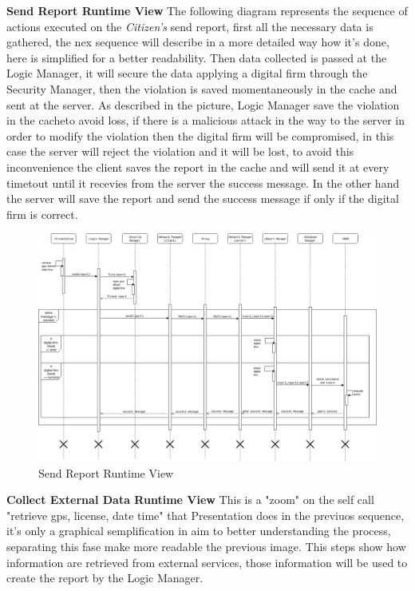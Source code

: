 \documentclass{article}
\begin{document}
\textbf{Send Report Runtime View}
The following diagram represents the sequence of actions executed on the \textit{Citizen's} send report, 
first all the necessary data is gathered, the nex sequence will describe in a more detailed way how it's 
done, here is simplified for a better readability. Then data collected is passed at the Logic Manager, 
it will secure the data applying a digital firm through the Security Manager, then the violation is 
saved momentaneously in the cache and sent at the server. As described in the picture, Logic Manager 
save the violation in the cacheto avoid loss, if there is a malicious attack in the way to the server 
in order to modify the violation then the digital firm will be compromised, in this case the server 
will reject the violation and it will be lost, to avoid this inconvenience the client saves the report 
in the cache and will send it at every timetout until it recevies from the server the success message. 
In the other hand the server will save the report and send the success message if only if the digital 
firm is correct. 

\begin{figure}[H]
    \centering
    \includegraphics[scale=0.4]{img/sequence_diagrams/send_report_sequence.png}
    \caption{Send Report Runtime View}
\end{figure}  

\textbf{Collect External Data Runtime View}  
This is a "zoom" on the self call "retrieve gps, license, date time" that Presentation does in the 
previuos sequence, it's only a graphical semplification in aim to better understanding the process, 
separating this fase make more readable the previous image. This steps show how information are 
retrieved from external services, those information will be used to create the report by the Logic Manager.
\end{document}
